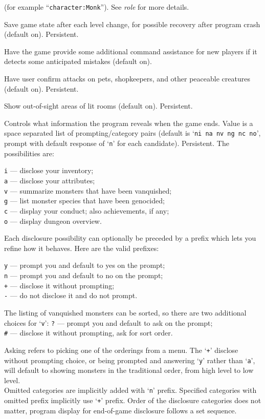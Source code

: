 (for example ``{\tt character:Monk}'').  See {\it role\/} for more details.
\item[\ib{checkpoint}]
Save game state after each level change, for possible recovery after
program crash (default on).  Persistent.
\item[\ib{cmdassist}]
Have the game provide some additional command assistance for new
players if it detects some anticipated mistakes (default on).
\item[\ib{confirm}]
Have user confirm attacks on pets, shopkeepers, and other
peaceable creatures (default on).  Persistent.
\item[\ib{dark\verb+_+room}]
Show out-of-sight areas of lit rooms (default on).  Persistent.
\item[\ib{disclose}]
Controls what information the program reveals when the game ends.
Value is a space separated list of prompting/category pairs
(default is `{\tt ni na nv ng nc no}',
prompt with default response of `{\tt n}' for each candidate).
Persistent.
The possibilities are:

{\tt i} --- disclose your inventory;\\
{\tt a} --- disclose your attributes;\\
{\tt v} --- summarize monsters that have been vanquished;\\
{\tt g} --- list monster species that have been genocided;\\
{\tt c} --- display your conduct; also achievements, if any;\\
{\tt o} --- display dungeon overview.

Each disclosure possibility can optionally be preceded by a prefix which
lets you refine how it behaves.  Here are the valid prefixes:

{\tt y} --- prompt you and default to yes on the prompt;\\
{\tt n} --- prompt you and default to no on the prompt;\\
{\tt +} --- disclose it without prompting;\\
{\tt -} --- do not disclose it and do not prompt.

The listing of vanquished monsters can be sorted,
so there are two additional choices for `{\tt v}':
{\tt ?} --- prompt you and default to ask on the prompt;\\
{\tt\#} --- disclose it without prompting, ask for sort order.

Asking refers to picking one of the orderings from a menu.
The `{\tt +}' disclose without prompting choice,
or being prompted and answering `{\tt y}' rather than `{\tt a}',
will default to showing monsters in the traditional order,
from high level to low level.\\
Omitted categories are implicitly added with `{\tt n}' prefix.
Specified categories with omitted prefix implicitly use `{\tt +}' prefix.
Order of the disclosure categories does not matter, program display for
end-of-game disclosure follows a set sequence.

